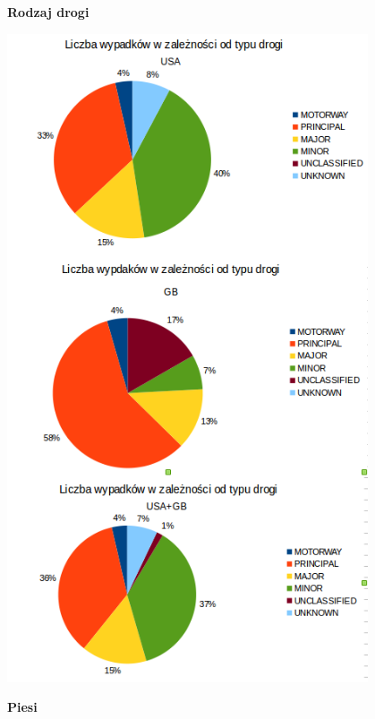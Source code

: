 \textbf{Rodzaj drogi}

\includegraphics[width=0.8\textwidth]{images/statistics/road_type.png}

\textbf{Piesi}

